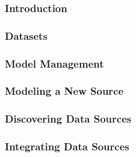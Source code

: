 \documentclass[runningheads,a4paper]{llncs}
\begin{document}
\subsubsection*{Introduction} 


\subsubsection*{Datasets}


\subsubsection*{Model Management} 


\subsubsection*{Modeling a New Source} 


\subsubsection*{Discovering Data Sources} 


\subsubsection*{Integrating Data Sources} 




\end{document}
